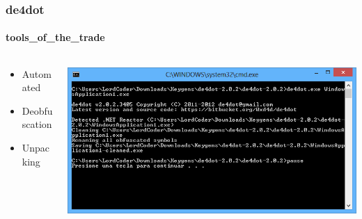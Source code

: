 \documentclass[aspectratio=169]{beamer}
\begin{document}
\begin{frame}
  \frametitle{de4dot}
  \framesubtitle{tools\_of\_the\_trade}
  \begin{columns}
    \begin{column}{.3\textwidth}
      \begin{itemize}
      \item{Automated}
      \item{Deobfuscation}
      \item{Unpacking}
      \end{itemize}
    \end{column}
    \hfill
    \begin{column}{.7\textwidth}
      \includegraphics[scale=.55]{de4dot}
    \end{column}
  \end{columns}
\end{frame}
\end{document}
